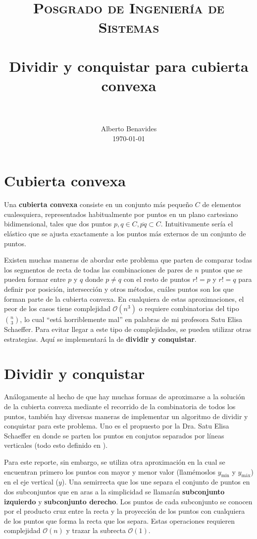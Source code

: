 \documentclass[paper=leter, fontsize=11pt]{scrartcl}
\title{
		\usefont{OT1}{bch}{b}{n}
		\normalfont \normalsize \textsc{Posgrado de Ingeniería de Sistemas} \\ [25pt]
		\horrule{0.5pt} \\[0.4cm]
		\huge Dividir y conquistar para cubierta convexa \\
		\horrule{2pt} \\[0.5cm]
}
\author{
		\normalfont 								\normalsize
        Alberto Benavides\\[-3pt]		\normalsize
        \today
}
\date{}
\numberwithin{equation}{section}		%
\numberwithin{figure}{section}			%
\numberwithin{table}{section}				%
\begin{document}
\maketitle

\section{Cubierta convexa}
Una \textbf{cubierta convexa} consiste en un conjunto más pequeño $C$ de elementos cualesquiera, representados habitualmente por puntos en un plano cartesiano bidimensional, tales que dos puntos $p, q \in C, \overline{pq} \subset C$. Intuitivamente sería el elástico que se ajusta exactamente a los puntos más externos de un conjunto de puntos.

Existen muchas maneras de abordar este problema que parten de comparar todas los segmentos de recta de todas las combinaciones de pares de $n$ puntos que se pueden formar entre $p$ y $q$ donde $p \neq q$ con el resto de puntos $r != p$ y $r != q$ para definir por posición, intersección y otros métodos, cuáles puntos son los que forman parte de la cubierta convexa. En cualquiera de estas aproximaciones, el peor de los casos tiene complejidad $\mathcal{O}(n^3)$ o requiere combinatorias del tipo $\binom{n}{3}$, lo cual ``está horriblemente mal'' en palabras de mi profesora Satu Elisa Schaeffer. Para evitar llegar a este tipo de complejidades, se pueden utilizar otras estrategias. Aquí se implementará la de \textbf{dividir y conquistar}.

\section{Dividir y conquistar}
Análogamente al hecho de que hay muchas formas de aproximarse a la solución de la cubierta convexa mediante el recorrido de la combinatoria de todos los puntos, también hay diversas maneras de implementar un algoritmo de dividir y conquistar para este problema. Uno es el propuesto por la Dra. Satu Elisa Schaeffer en donde se parten los puntos en conjutos separados por líneas verticales (todo esto definido en \cite{aa}).

Para este reporte, sin embargo, se utiliza otra aproximación en la cual se encuentran primero los puntos con mayor y menor valor (llamémoslos $y_{\text{mín}}$ y $y_{\text{máx}}$) en el eje vertical ($y$). Una semirrecta que los une separa el conjunto de puntos en dos subconjuntos que en aras a la simplicidad se llamarán \textbf{subconjunto izquierdo} y \textbf{subconjunto derecho}. Los puntos de cada subconjunto se conocen por el producto cruz entre la recta y la proyección de los puntos con cualquiera de los puntos que forma la recta que los separa. Estas operaciones requieren complejidad $\mathcal{O}(n)$ y trazar la subrecta $\mathcal{O}(1)$. 
\end{document}

